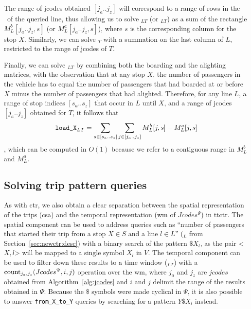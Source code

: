     The range of jcodes obtained $[j_a..j_z]$ will correspond to a range of rows in the \tm~of the queried line, thus allowing us to solve \boardX$_{LT}$ (or \alightX$_{LT}$) as a sum of the rectangle $M^b_L[j_a..j_z, s]$ (or $M^a_L[j_a..j_z, s]$), where $s$ is the corresponding column for the stop $X$. Similarly, we can solve \useL$_T$ with a summation on the last column of $L$, restricted to the range of jcodes of $T$.
    
    Finally, we can solve \loadX$_{LT}$ by combining both the boarding and the alighting matrices, with the observation that at any stop $X$, the number of passengers in the vehicle has to equal the number of passengers that had boarded at or before $X$ minus the number of passengers that had alighted. Therefore, for any line $L$, a range of stop indices $[s_a..s_z]$ that occur in $L$ until $X$, and a range of jcodes $[j_a..j_z]$ obtained for $T$, it follows that 
    \[\texttt{load\_X}_{LT} = 
    \displaystyle\sum_{s \in [s_a..s_z]}
    \displaystyle\sum_{j \in [j_a..j_z]}
    M^b_L[j,s] - M^a_L[j,s]\]
    , which can be computed in $O(1)$ because we refer to a contiguous range in $M^b_L$ and $M^a_L$.
	
	\subsection{Solving trip pattern queries}
	\label{sec:newctr:algo:xy}
	As with \gls{ctr}, we also obtain a clear separation between the spatial representation of the trips (\gls{csa}) and the temporal representation (\gls{wm} of $Jcodes^{\Psi}$) in \gls{ttctr}. The spatial component can be used to address queries such as ``number of passengers that started their trip from a stop $X\in S$ and a line $l\in L$'' (\texttt{\startX$_{L}$} from Section~\ref{sec:newctr:desc}) with a binary search of the pattern $\$X_l$, as the pair <$X,l$> will be mapped to a single symbol $X_l$ in $V$. The temporal component can be used to filter down these results to a time window (\texttt{\startX$_{LT}$}) with a $\operatorname{count}_{j_a,j_z}(Jcodes^{\Psi},i,j)$ operation over the \gls{wm}, where $j_a$ and $j_z$ are $jcodes$ obtained from Algorithm~\ref{alg:jcodes} and $i$ and $j$ delimit the range of the results obtained in $\Psi$. Because the $\$$ symbols were made cyclical in $\Psi$, it is also possible to answer \texttt{from\_X\_to\_Y} queries by searching for a pattern $Y\$X_l$ instead.
	
